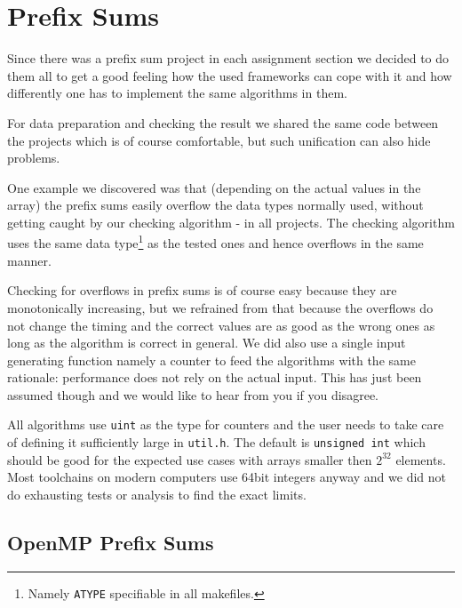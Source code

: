 \chapter{Prefix Sums}

Since there was a prefix sum project in each assignment section we decided to do them all to get a good feeling how the used frameworks can cope with it and how differently one has to implement the same algorithms in them.

For data preparation and checking the result we shared the same code between the projects which is of course comfortable, but such unification can also hide problems.

One example we discovered was that (depending on the actual values in the array) the prefix sums easily overflow the data types normally used, without getting caught by our checking algorithm - in all projects.
The checking algorithm uses the same data type\footnote{Namely \texttt{ATYPE} specifiable in all makefiles.} as the tested ones and hence overflows in the same manner.

Checking for overflows in prefix sums is of course easy because they are monotonically increasing, but we refrained from that because the overflows do not change the timing and the correct values are as good as the wrong ones as long as the algorithm is correct in general.
We did also use a single input generating function namely a counter to feed the algorithms with the same rationale: performance does not rely on the actual input.
This has just been assumed though and we would like to hear from you if you disagree.

All algorithms use \texttt{uint} as the type for counters and the user needs to take care of defining it sufficiently large in \texttt{util.h}.
The default is \texttt{unsigned int} which should be good for the expected use cases with arrays smaller then $2^32$ elements.
Most toolchains on modern computers use 64bit integers anyway and we did not do exhausting tests or analysis to find the exact limits.

\section{OpenMP Prefix Sums}
\openmpprefixseqn
{}\openmpprefixauxarrn
{}\openmpprefixinplacen
{}\openmpprefixhillisn

